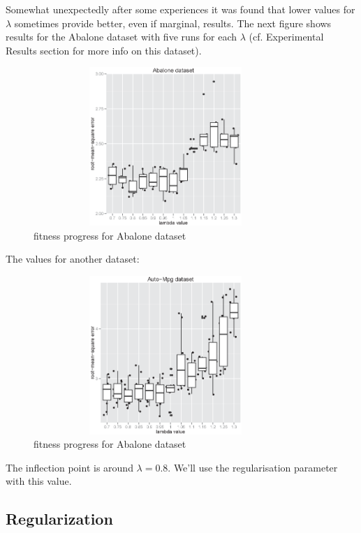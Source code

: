 \documentclass[a4paper, 12pt]{article}
\begin{document}
Somewhat unexpectedly after some experiences it was found that lower values for $\lambda$ sometimes provide better, even if marginal, results. The next figure shows results for the Abalone dataset with five runs for each $\lambda$ (cf. Experimental Results section for more info on this dataset).

\begin{figure}[htb]
	\begin{center}
		\includegraphics[height=6cm,width=10cm,angle=0]
			{figures/Abalone_dataset_lambdas.eps}
		\caption{fitness progress for Abalone dataset}
	\end{center}
\end{figure}

The values for another dataset:

\begin{figure}[htb]
	\begin{center}
		\includegraphics[height=6cm,width=10cm,angle=0]
			{figures/Auto-Mpg_dataset_lambdas.eps}
		\caption{fitness progress for Abalone dataset}
	\end{center}
\end{figure}

The inflection point is around $\lambda = 0.8$. We'll use the regularisation parameter with this value.

\subsection{Regularization}
\end{document}
